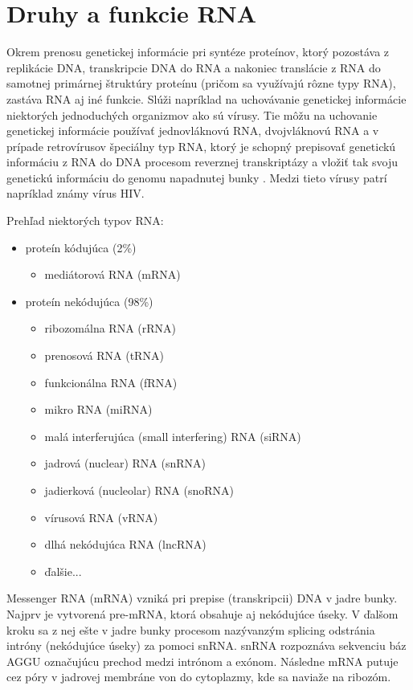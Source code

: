 \section{Druhy a funkcie RNA}
Okrem prenosu genetickej informácie pri syntéze proteínov, ktorý pozostáva z replikácie DNA, transkripcie DNA do RNA a nakoniec translácie z RNA do samotnej primárnej štruktúry proteínu (pričom sa využívajú rôzne typy RNA), zastáva RNA aj iné funkcie. Slúži napríklad na uchovávanie genetickej informácie niektorých jednoduchých organizmov ako sú vírusy. Tie môžu na uchovanie genetickej informácie používať jednovláknovú RNA, dvojvláknovú RNA a v prípade retrovírusov špeciálny typ RNA, ktorý je schopný prepisovať genetickú informáciu z RNA do DNA procesom reverznej transkriptázy a vložiť tak svoju genetickú informáciu do genomu napadnutej bunky \cite{Alberts02}. Medzi tieto vírusy patrí napríklad známy vírus HIV.  \cite{Krupovice18}


\indent Prehľad niektorých typov RNA:
\begin{itemize}
\item proteín kódujúca (2\%)
\begin{itemize}
\item mediátorová RNA (mRNA)
\end{itemize}
\item proteín nekódujúca (98\%)
\begin{itemize}
\item ribozomálna RNA (rRNA)
\item prenosová RNA (tRNA)
\item funkcionálna RNA (fRNA)
\item mikro RNA (miRNA)
\item malá interferujúca (small interfering) RNA (siRNA)
\item jadrová (nuclear) RNA (snRNA)
\item jadierková (nucleolar) RNA (snoRNA)
\item vírusová RNA (vRNA)
\item dlhá nekódujúca RNA (lncRNA)
\item ďalšie...
\end{itemize}
\end{itemize}

\indent Messenger RNA (mRNA) vzniká pri prepise (transkripcii) DNA v jadre bunky. Najprv je vytvorená pre-mRNA, ktorá obsahuje aj nekódujúce úseky. V ďalšom kroku sa z nej ešte v jadre bunky procesom nazývanzým splicing odstránia intróny (nekódujúce úseky) za pomoci snRNA. snRNA rozpoznáva sekvenciu báz AGGU označujúcu prechod medzi intrónom  a exónom. Následne mRNA putuje cez póry v jadrovej membráne von do cytoplazmy, kde sa naviaže na ribozóm. \cite{Alberts02}


